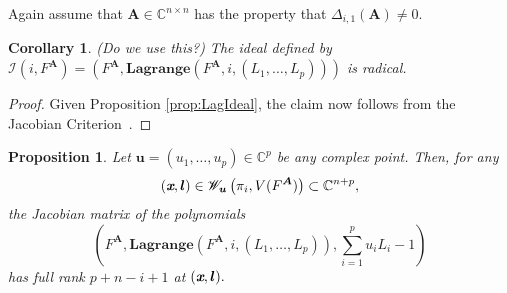 \documentclass[a4paper]{article}
\def\sI{\mathscr{I}}
\def\mA{{\bm A}}
\def\ub{{\bm u}}
\def\lb{{\bm l}}
\def\xb{\textit{\textbf{x}}}
\def\C{\mathbb{C}}
\def\lagFA{{\bm{Lagrange}}(F^{\mA},i,(L_1,\hdots,L_p))}
\def\udl{\sum_{i=1}^pu_iL_i}
\newtheorem{corollary}[theorem]{Corollary}
\newtheorem{prop}[theorem]{Proposition}
\begin{document}
    Again assume that $\mA \in \C^{n \times n}$ has the property that $\Delta_{i,1}(\mA) \not = 0.$    
    \begin{corollary} (Do we use this?)
     The ideal defined by $\sI(i,F^{\mA}) = \left(F^{\mA},\lagFA\right)$ is radical.
    \end{corollary}
    \begin{proof}
    Given Proposition \ref{prop:LagIdeal}, the claim now follows from the Jacobian Criterion~\cite[Corollary 16.20]{ECA}.
    \end{proof}
    \begin{prop}\label{prop:RadLagPolarV}
     Let $\ub = (u_1,\hdots,u_p) \in \C^p$ be any complex point. Then, for any \[(\xb,\lb)\in \mathscr{W}_{\ub}\left(\pi_i,V(F^{\mA})\right) \subset \C^{n+p},\] the Jacobian matrix of the polynomials
     \[
    \left( F^{\mA},\lagFA,\udl-1\right) 
    \]
 has full rank $p+n-i+1$ at $(\xb,\lb).$ 
    \end{prop}
\end{document}
